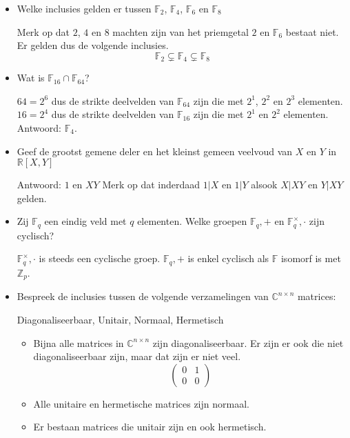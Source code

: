 \documentclass[main.tex]{subfiles}
\begin{document}
\begin{itemize}
 \item Welke inclusies gelden er tussen $\mathbb{F}_{2}$, $\mathbb{F}_{4}$, $\mathbb{F}_{6}$ en $\mathbb{F}_{8}$

   Merk op dat $2$, $4$ en $8$ machten zijn van het priemgetal $2$ en $\mathbb{F}_{6}$ bestaat niet. Er gelden dus de volgende inclusies.
   \[ \mathbb{F}_{2} \subsetneq \mathbb{F}_{4} \subsetneq \mathbb{F}_{8} \]

 \item Wat is $\mathbb{F}_{16}\cap \mathbb{F}_{64}$?

   $64=2^{6}$ dus de strikte deelvelden van $\mathbb{F}_{64}$ zijn die met $2^{1}$, $2^{2}$ en $2^{3}$ elementen.
   $16=2^{4}$ dus de strikte deelvelden van $\mathbb{F}_{16}$ zijn die met $2^{1}$ en $2^{2}$ elementen.
   Antwoord: $\mathbb{F}_{4}$.

 \item Geef de grootst gemene deler en het kleinst gemeen veelvoud van $X$ en $Y$ in $\mathbb{R}[X,Y]$

   Antwoord: $1$ en $XY$
   Merk op dat inderdaad $1 | X$ en $1 | Y$ alsook $X | XY$ en $Y | XY$ gelden.

 \item Zij $\mathbb{F}_{q}$ een eindig veld met $q$ elementen.
   Welke groepen $\mathbb{F}_{q},+$ en $\mathbb{F}_{q}^{\times},\cdot$ zijn cyclisch?

   $\mathbb{F}_{q}^{\times},\cdot$ is steeds een cyclische groep.
   $\mathbb{F}_{q},+$ is enkel cyclisch als $\mathbb{F}$ isomorf is met $\mathbb{Z}_{p}$.

 \item Bespreek de inclusies tussen de volgende verzamelingen van $\mathbb{C}^{n \times n}$ matrices:
   \begin{center}
     Diagonaliseerbaar, Unitair, Normaal, Hermetisch
   \end{center}
   \begin{itemize}
   \item 
     Bijna alle matrices in $\mathbb{C}^{n\times n}$ zijn diagonaliseerbaar.
     Er zijn er ook die niet diagonaliseerbaar zijn, maar dat zijn er niet veel.
     \[
     \begin{pmatrix}
       0 & 1\\
       0 & 0
     \end{pmatrix}
     \]
   \item Alle unitaire en hermetische matrices zijn normaal.
   \item Er bestaan matrices die unitair zijn en ook hermetisch. 
   \end{itemize}
 \end{itemize}
\end{document}
